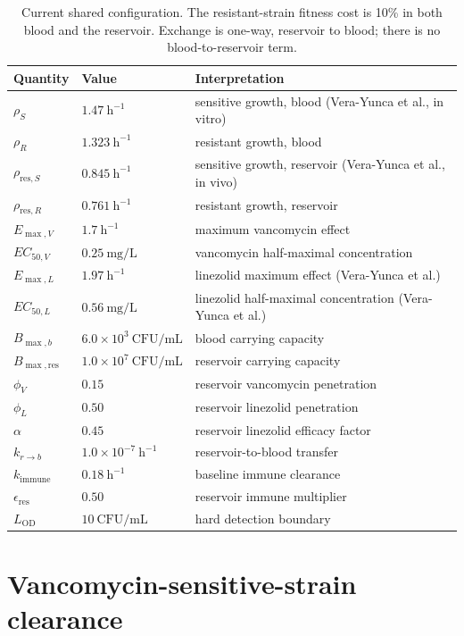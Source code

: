 \documentclass[11pt]{article}
\newcommand{\EC}{EC_{50,L}}
\newcommand{\EM}{E_{\max,L}}
\newcommand{\KI}{k_{\mathrm{immune}}}
\newcommand{\LOD}{L_{\mathrm{OD}}}
\begin{document}
\begin{table}[htbp]
\centering
\small
\begin{tabular}{@{}lll@{}}
\toprule
Quantity & Value & Interpretation \\
\midrule
$\rho_S$ & $1.47~\mathrm{h}^{-1}$ & sensitive growth, blood (Vera-Yunca et al., in vitro) \\
$\rho_R$ & $1.323~\mathrm{h}^{-1}$ & resistant growth, blood \\
$\rho_{\mathrm{res},S}$ & $0.845~\mathrm{h}^{-1}$ & sensitive growth, reservoir (Vera-Yunca et al., in vivo) \\
$\rho_{\mathrm{res},R}$ & $0.761~\mathrm{h}^{-1}$ & resistant growth, reservoir \\
$E_{\max,V}$ & $1.7~\mathrm{h}^{-1}$ & maximum vancomycin effect \\
$EC_{50,V}$ & $0.25~\mathrm{mg/L}$ & vancomycin half-maximal concentration \\
$\EM$ & $1.97~\mathrm{h}^{-1}$ & linezolid maximum effect (Vera-Yunca et al.) \\
$\EC$ & $0.56~\mathrm{mg/L}$ & linezolid half-maximal concentration (Vera-Yunca et al.) \\
$B_{\max,b}$ & $6.0\times10^3~\mathrm{CFU/mL}$ & blood carrying capacity \\
$B_{\max,\mathrm{res}}$ & $1.0\times10^7~\mathrm{CFU/mL}$ & reservoir carrying capacity \\
$\phi_V$ & $0.15$ & reservoir vancomycin penetration \\
$\phi_L$ & $0.50$ & reservoir linezolid penetration \\
$\alpha$ & $0.45$ & reservoir linezolid efficacy factor \\
$k_{r\to b}$ & $1.0\times10^{-7}~\mathrm{h}^{-1}$ & reservoir-to-blood transfer \\
$\KI$ & $0.18~\mathrm{h}^{-1}$ & baseline immune clearance \\
$\epsilon_{\mathrm{res}}$ & $0.50$ & reservoir immune multiplier \\
$\LOD$ & $10~\mathrm{CFU/mL}$ & hard detection boundary \\
\bottomrule
\end{tabular}
\caption{Current shared configuration. The resistant-strain fitness cost is
10\% in both blood and the reservoir. Exchange is one-way, reservoir to
blood; there is no blood-to-reservoir term.}
\label{tab:parameters}
\end{table}

\section{Vancomycin-sensitive-strain clearance}
\end{document}
